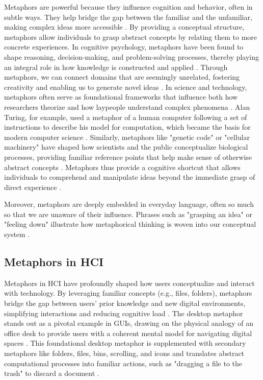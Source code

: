 Metaphors are powerful because they influence cognition and behavior, often in subtle ways. They help bridge the gap between the familiar and the unfamiliar, making complex ideas more accessible \cite{Gentner_Hoyos_2017}. By providing a conceptual structure, metaphors allow individuals to grasp abstract concepts by relating them to more concrete experiences. In cognitive psychology, metaphors have been found to shape reasoning, decision-making, and problem-solving processes, thereby playing an integral role in how knowledge is constructed and applied \cite{Moser_2000, Cameron_Maslen_2010}. Through metaphors, we can connect domains that are seemingly unrelated, fostering creativity and enabling us to generate novel ideas \cite{Lockton_Singh_Sabnis_Chou_Foley_Pantoja_2019}. In science and technology, metaphors often serve as foundational frameworks that influence both how researchers theorize and how laypeople understand complex phenomena \cite{Hofstadter_1995}. Alan Turing, for example, used a metaphor of a human computer following a set of instructions to describe his model for computation, which became the basis for modern computer science \cite{Piccinini_2003}. Similarly, metaphors like "genetic code" or "cellular machinery" have shaped how scientists and the public conceptualize biological processes, providing familiar reference points that help make sense of otherwise abstract concepts \cite{Keller_2003}. Metaphors thus provide a cognitive shortcut that allows individuals to comprehend and manipulate ideas beyond the immediate grasp of direct experience \cite{Black_1962}.

Moreover, metaphors are deeply embedded in everyday language, often so much so that we are unaware of their influence. Phrases such as "grasping an idea" or "feeling down" illustrate how metaphorical thinking is woven into our conceptual system \cite{Lakoff_Johnson_1980}.

\subsection{Metaphors in HCI}

Metaphors in HCI have profoundly shaped how users conceptualize and interact with technology. By leveraging familiar concepts (e.g., files, folders), metaphors bridge the gap between users' prior knowledge and new digital environments, simplifying interactions and reducing cognitive load \cite{Neale_Carroll_1997, Carroll_Thomas_1982}. The desktop metaphor stands out as a pivotal example in GUIs, drawing on the physical analogy of an office desk to provide users with a coherent mental model for navigating digital spaces \cite{Johnson-Laird_1983}. This foundational desktop metaphor is supplemented with secondary metaphors like folders, files, bins, scrolling, and icons and translates abstract computational processes into familiar actions, such as "dragging a file to the trash" to discard a document \cite{Colburn_Shute_2008}.

